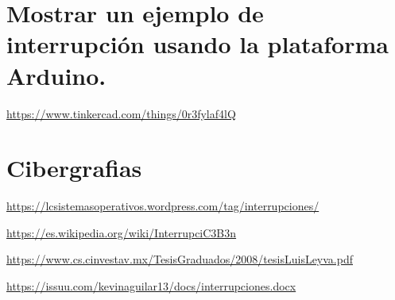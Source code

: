 \documentclass{article}
\begin{document}
\section{Mostrar un ejemplo de interrupción usando la plataforma Arduino.}

\url{https://www.tinkercad.com/things/0r3fylaf4lQ}
\vspace{10mm}
\section{Cibergrafias}
\url{https://lcsistemasoperativos.wordpress.com/tag/interrupciones/}
\par
\vspace{2mm}
\url{https://es.wikipedia.org/wiki/InterrupciC3B3n}
\par
\vspace{2mm}
\url{https://www.cs.cinvestav.mx/TesisGraduados/2008/tesisLuisLeyva.pdf}
\vspace{2mm}
\par
\url{https://issuu.com/kevinaguilar13/docs/interrupciones.docx}
\end{document}
